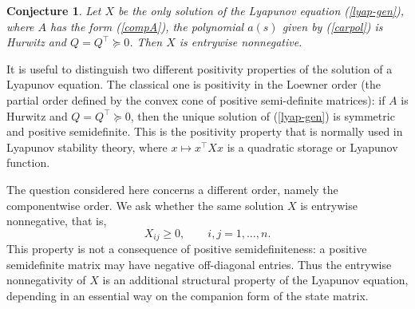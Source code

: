 \documentclass[12pt]{article}
\newcommand{\tp}{^{\top}}
\newtheorem{conjecture}{Conjecture}[section]
\begin{document}
\begin{conjecture}\label{conj}
Let $X$ be the only solution of the Lyapunov equation (\ref{lyap-gen}), where $A$ has the form 
(\ref{compA}), the polynomial $a(s)$ given by (\ref{carpol}) is Hurwitz and $Q=Q\tp\succeq  0$.
Then $X$ is entrywise nonnegative.
\end{conjecture}

It is useful to distinguish two different positivity properties of the
solution of a Lyapunov equation.  The classical one is positivity in the
Loewner order (the partial order defined by the convex cone of positive semi-definite matrices): if $A$ is Hurwitz and $Q=Q\tp\succeq0$, then the unique
solution of (\ref{lyap-gen})
is symmetric and positive semidefinite.  This is the positivity property that
is normally used in Lyapunov stability theory, where $x\mapsto x\tp Xx$ is a
quadratic storage or Lyapunov function.

The question considered here concerns a different order, namely the
componentwise order.  We ask whether the same solution $X$ is entrywise
nonnegative, that is,
\[
X_{ij}\ge0,\qquad i,j=1,\dots,n.
\]
This property is not a  consequence of positive semidefiniteness: a
positive semidefinite matrix may have negative off-diagonal entries.  Thus the
entrywise nonnegativity of $X$ is an additional structural property of the
Lyapunov equation, depending in an essential way on the companion form of the
state matrix.
\end{document}
